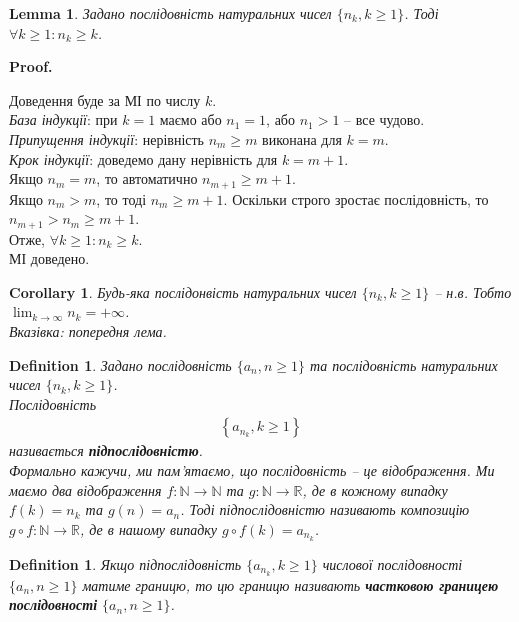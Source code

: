 \documentclass[a4paper, 14pt]{article}
\makeatletter
\def\qed{$\blacksquare$}
\theoremstyle{theoremdd}
\theoremstyle{theoremdd}
\newtheorem{definition}[theorem]{Definition}
\theoremstyle{theoremdd}
\theoremstyle{theoremdd}
\theoremstyle{theoremdd}
\theoremstyle{theoremdd}
\theoremstyle{theoremdd}
\newtheorem{lemma}[theorem]{Lemma}
\theoremstyle{theoremdd}
\newtheorem{corollary}[theorem]{Corollary}
\renewenvironment{proof}[1][Proof.\\]{\par
\pushQED{\hfill \qed}%
\normalfont \topsep6\p@\@plus6\p@\relax
\trivlist
\item\relax
{\bfseries
#1\@addpunct{.}}\hspace\labelsep\ignorespaces
}{%
\popQED\endtrivlist\@endpefalse
}
\makeatother
\begin{document}
	\begin{lemma}
	Задано послідовність натуральних чисел $\{n_k, k \geq 1\}$. Тоді $\forall k \geq 1: n_k \geq k$.
	\end{lemma}
	
	\begin{proof}
	Доведення буде за МІ по числу $k$.\\
	\textit{База індукції}: при $k = 1$ маємо або $n_1 = 1$, або $n_1 > 1$ -- все чудово.\\
	\textit{Припущення індукції}: нерівність $n_m \geq m$ виконана для $k=m$.\\
	\textit{Крок індукції}: доведемо дану нерівність для $k=m+1$.\\
	Якщо $n_m = m$, то автоматично $n_{m+1} \geq m+1$.\\
	Якщо $n_m > m$, то тоді $n_m \geq m+1$. Оскільки строго зростає послідовність, то $n_{m+1} > n_m \geq m+1$.\\
	Отже, $\forall k \geq 1: n_k \geq k$. \\
	МІ доведено.
	\end{proof}
	
	\begin{corollary}
	Будь-яка послідонвість натуральних чисел $\{n_k, k \geq 1\}$ -- н.в. Тобто $\displaystyle\lim_{k \to \infty} n_k = +\infty$.\\
	\textit{Вказівка: попередня лема.}
	\end{corollary}
	
	\begin{definition}
	Задано послідовність $\{a_n, n \geq 1\}$ та послідовність натуральних чисел $\{n_k, k \geq 1\}$.\\
	Послідовність
	\begin{align*}
	\left\{a_{n_k}, k \geq 1\right\}
	\end{align*}
	називається \textbf{підпослідовністю}.\\
	Формально кажучи, ми пам'ятаємо, що послідовність -- це відображення. Ми маємо два відображення $f \colon \mathbb{N} \to \mathbb{N}$ та $g \colon \mathbb{N} \to \mathbb{R}$, де в кожному випадку $f(k) = n_k$ та $g(n) = a_n$. Тоді підпослідовністю називають композицію $g \circ f \colon \mathbb{N} \to \mathbb{R}$, де в нашому випадку $g \circ f (k) = a_{n_k}$.
	\end{definition}
	
	\begin{definition}
	Якщо підпослідовність $\{a_{n_k}, k \geq 1\}$ числової послідовності $\{a_n, n \geq 1\}$ матиме границю, то цю границю називають \textbf{частковою границею послідовності} $\{a_n, n \geq 1\}$.
	\end{definition}
	
\end{document}
